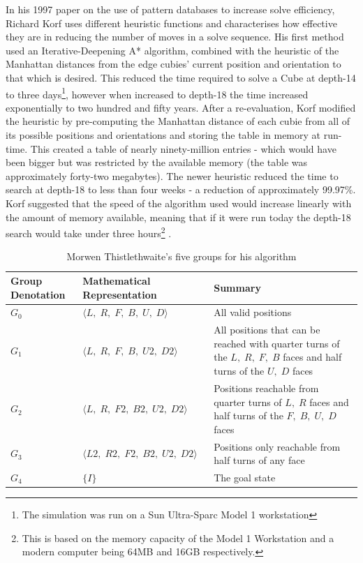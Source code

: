 \documentclass{report}
\begin{document}
    In his 1997 paper on the use of pattern databases to increase solve efficiency, Richard Korf uses different heuristic functions and characterises how effective they are in reducing the number of moves in a solve sequence. His first method used an Iterative-Deepening A* algorithm, combined with the heuristic of the Manhattan distances from the edge cubies' current position and orientation to that which is desired. This reduced the time required to solve a Cube at depth-14 to three days\footnote{The simulation was run on a Sun Ultra-Sparc Model 1 workstation}, however when increased to depth-18 the time increased exponentially to two hundred and fifty years. After a re-evaluation, Korf modified the heuristic by pre-computing the Manhattan distance of each cubie from all of its possible positions and orientations and storing the table in memory at run-time. This created a table of nearly ninety-million entries - which would have been bigger but was restricted by the available memory (the table was approximately forty-two megabytes). The newer heuristic reduced the time to search at depth-18 to less than four weeks - a reduction of approximately 99.97\%. Korf suggested that the speed of the algorithm used would increase linearly with the amount of memory available, meaning that if it were run today the depth-18 search would take under three hours\footnote{This is based on the memory capacity of the Model 1 Workstation and a modern computer being 64MB and 16GB respectively.} \cite{Korf1997}.
    
   	\begin{table}[htbp]
    	\def\arraystretch{1.25}
    	\centering
    	\caption{Morwen Thistlethwaite's five groups for his algorithm \cite{Singmaster1981}}
    	\label{tab:thistlethwaite}
    	\begin{tabular}{M{0.15\textwidth}M{0.3\textwidth}m{0.47\textwidth}}
    		\toprule
    		\textbf{Group Denotation} & \textbf{Mathematical Representation} & \textbf{Summary} \\
    		\midrule
   			$G_0$	&	$\langle L,\;R,\;F,\;B,\;U,\;D \rangle$	&	All valid positions \\    		
	    	$G_1$	&	$\langle L,\;R,\;F,\;B,\;U2,\;D2 \rangle$	&	All positions that can be reached with quarter turns of the $L,\;R,\;F,\;B$ faces and half turns of the $U,\;D$ faces \\
	    	$G_2$	&	$\langle L,\;R,\;F2,\;B2,\;U2,\;D2 \rangle$	&	Positions reachable from quarter turns of $L,\;R$ faces and half turns of the $F,\;B,\;U,\;D$ faces \\
	    	$G_3$	&	$\langle L2,\;R2,\;F2,\;B2,\;U2,\;D2 \rangle$	&	Positions only reachable from half turns of any face \\
	    	$G_4$	&	$ \{I\}$	&	The goal state \\
    		\bottomrule
    	\end{tabular}
    \end{table}
    
\end{document}
